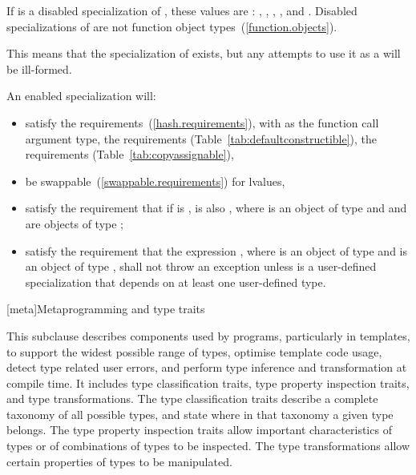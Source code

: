 \pnum
If  is a disabled specialization of ,
these values are :
,
,
,
, and
.
Disabled specializations of 
are not function object types~(\ref{function.objects}).
\begin{note}
This means that the specialization of  exists, but
any attempts to use it as a  will be ill-formed.
\end{note}

\pnum
An enabled specialization  will:
\begin{itemize}
\item satisfy the  requirements~(\ref{hash.requirements}),
with  as the function
call argument type, the  requirements (Table~\ref{tab:defaultconstructible}),
the  requirements (Table~\ref{tab:copyassignable}),
\item be swappable~(\ref{swappable.requirements}) for lvalues,
\item satisfy the requirement that if  is ,  is
also , where  is an object of type  and  and 
are objects of type ;
\item satisfy the requirement that the expression , where 
is an object of type  and  is an object of type
, shall not throw an exception unless  is a
user-defined specialization that depends on at least one user-defined type.
\end{itemize}

[meta]{Metaprogramming and type traits}

\pnum
This subclause describes components used by \Cpp programs, particularly in
templates, to support the widest possible range of types, optimise
template code usage, detect type related user errors, and perform
type inference and transformation at compile time. It includes type
classification traits, type property inspection traits, and type
transformations. The type classification traits describe a complete taxonomy
of all possible \Cpp types, and state where in that taxonomy a given
type belongs. The type property inspection traits allow important
characteristics of types or of combinations of types to be inspected. The
type transformations allow certain properties of types to be manipulated.

